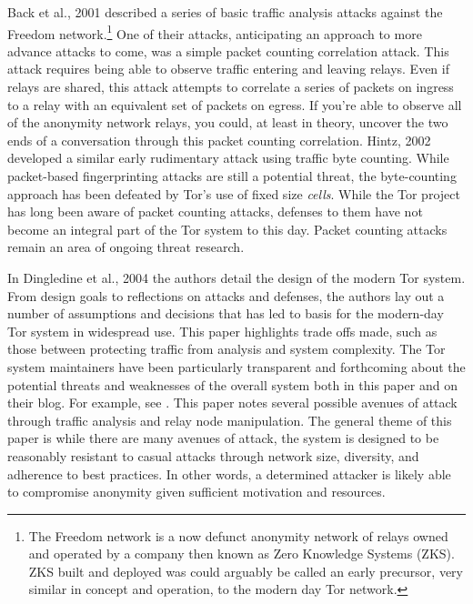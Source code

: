 \documentclass[sigconf]{acmart}
\begin{document}
Back et al., 2001 \cite{back_traffic_2001} described a series of basic
traffic analysis attacks against the Freedom network.\footnote{The
Freedom network is a now defunct anonymity network of relays owned and
operated by a company then known as Zero Knowledge Systems (ZKS).  ZKS
built and deployed was could arguably be called an early precursor, very
similar in concept and operation, to the modern day Tor network.}  One
of their attacks, anticipating an approach to more advance attacks to
come, was a simple packet counting correlation attack.  This attack
requires being able to observe traffic entering and leaving relays.
Even if relays are shared, this attack attempts to correlate a series of
packets on ingress to a relay with an equivalent set of packets on
egress.  If you're able to observe all of the anonymity network relays,
you could, at least in theory, uncover the two ends of a conversation
through this packet counting correlation.  Hintz, 2002
\cite{hintz_fingerprinting_2002} developed a similar early rudimentary
attack using traffic byte counting.  While packet-based fingerprinting
attacks are still a potential threat, the byte-counting approach has
been defeated by Tor's use of fixed size \emph{cells}.  While the Tor
project has long been aware of packet counting attacks, defenses to them
have not become an integral part of the Tor system to this day.  Packet
counting attacks remain an area of ongoing threat research.

In Dingledine et al., 2004 \cite{dingledine_tor:_2004} the authors
detail the design of the modern Tor system.  From design goals to
reflections on attacks and defenses, the authors lay out a number of
assumptions and decisions that has led to basis for the modern-day Tor
system in widespread use.  This paper highlights trade offs made, such as
those between protecting traffic from analysis and system complexity.
The Tor system maintainers have been particularly transparent and
forthcoming about the potential threats and weaknesses of the overall
system both in this paper and on their blog.  For example, see
\cite{dingledine_research_2011}.  This paper notes several possible
avenues of attack through traffic analysis and relay node manipulation.
The general theme of this paper is while there are many avenues of
attack, the system is designed to be reasonably resistant to casual
attacks through network size, diversity, and adherence to best
practices.  In other words, a determined attacker is likely able to
compromise anonymity given sufficient motivation and resources.
\end{document}
